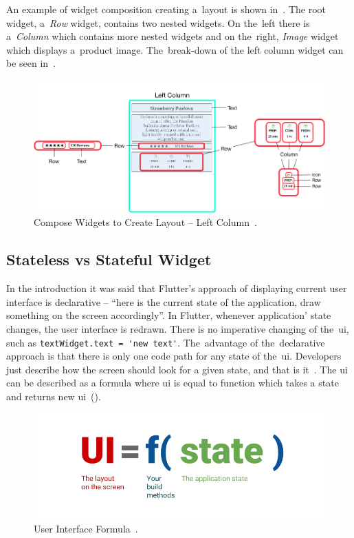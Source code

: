 An example of widget composition creating a~layout is shown in~. The root widget, a~\textit{Row} widget, contains two nested widgets. On the~left there is a~\textit{Column} which contains more nested widgets and on the~right, \textit{Image} widget which displays a~product image. The~break-down of the left column widget can be seen in~. 

\begin{figure}[htp]
    \centering
    \includegraphics[width=0.9\linewidth]{img/flutter/layout_compose_detail.png}
    \caption{Compose Widgets to Create Layout -- Left Column~\cite{flutter-widget-layout}.}
    \label{fig:flutter-compose-widget-detail}
\end{figure}
\subsection{Stateless vs Stateful Widget}
In the introduction it was said that Flutter's approach of displaying current user interface is declarative -- ``here is the current state of the application, draw something on the screen accordingly''.  In Flutter, whenever application' state changes, the user interface is redrawn. There is no imperative changing of the~\gls{ui}, such as \verb|textWidget.text = 'new text'|. The~advantage of the~declarative approach is that there is only one code path for any state of the~\gls{ui}. Developers just describe how the screen should look for a given state, and that is it~\cite{flutter-declarative}. The \gls{ui} can be described as a formula where \gls{ui} is equal to function which takes a state and returns new \gls{ui}~().

\begin{figure}[htp]
    \centering
    \includegraphics[width=0.6\linewidth]{img/flutter/ui_f_state.png}
    \caption{User Interface Formula~\cite{flutter-declarative}.}
    \label{fig:flutter-ui-formula}
\end{figure}
